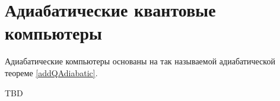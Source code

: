 \section{Адиабатические квантовые компьютеры}

Адиабатические компьютеры основаны на так называемой адиабатической
теореме \autoref {addQAdiabatic}.

TBD

